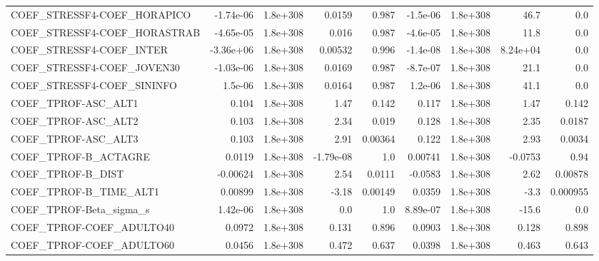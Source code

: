 \begin{tabular}{lrrrrrrrr}
COEF\_STRESSF4-COEF\_HORAPICO       &   -1.74e-06 &     1.8e+308 &    0.0159 &    0.987 &   -1.5e-06 &    1.8e+308 &         46.7 &           0.0 \\
COEF\_STRESSF4-COEF\_HORASTRAB      &   -4.65e-05 &     1.8e+308 &     0.016 &    0.987 &   -4.6e-05 &    1.8e+308 &         11.8 &           0.0 \\
COEF\_STRESSF4-COEF\_INTER          &   -3.36e+06 &     1.8e+308 &   0.00532 &    0.996 &   -1.4e-08 &    1.8e+308 &     8.24e+04 &           0.0 \\
COEF\_STRESSF4-COEF\_JOVEN30        &   -1.03e-06 &     1.8e+308 &    0.0169 &    0.987 &   -8.7e-07 &    1.8e+308 &         21.1 &           0.0 \\
COEF\_STRESSF4-COEF\_SININFO        &     1.5e-06 &     1.8e+308 &    0.0164 &    0.987 &    1.2e-06 &    1.8e+308 &         41.1 &           0.0 \\
COEF\_TPROF-ASC\_ALT1               &       0.104 &     1.8e+308 &      1.47 &    0.142 &      0.117 &    1.8e+308 &         1.47 &         0.142 \\
COEF\_TPROF-ASC\_ALT2               &       0.103 &     1.8e+308 &      2.34 &    0.019 &      0.128 &    1.8e+308 &         2.35 &        0.0187 \\
COEF\_TPROF-ASC\_ALT3               &       0.103 &     1.8e+308 &      2.91 &  0.00364 &      0.122 &    1.8e+308 &         2.93 &        0.0034 \\
COEF\_TPROF-B\_ACTAGRE              &      0.0119 &     1.8e+308 & -1.79e-08 &      1.0 &    0.00741 &    1.8e+308 &      -0.0753 &          0.94 \\
COEF\_TPROF-B\_DIST                 &    -0.00624 &     1.8e+308 &      2.54 &   0.0111 &    -0.0583 &    1.8e+308 &         2.62 &       0.00878 \\
COEF\_TPROF-B\_TIME\_ALT1            &     0.00899 &     1.8e+308 &     -3.18 &  0.00149 &     0.0359 &    1.8e+308 &         -3.3 &      0.000955 \\
COEF\_TPROF-Beta\_sigma\_s           &    1.42e-06 &     1.8e+308 &       0.0 &      1.0 &   8.89e-07 &    1.8e+308 &        -15.6 &           0.0 \\
COEF\_TPROF-COEF\_ADULTO40          &      0.0972 &     1.8e+308 &     0.131 &    0.896 &     0.0903 &    1.8e+308 &        0.128 &         0.898 \\
COEF\_TPROF-COEF\_ADULTO60          &      0.0456 &     1.8e+308 &     0.472 &    0.637 &     0.0398 &    1.8e+308 &        0.463 &         0.643 \\

\end{tabular}
